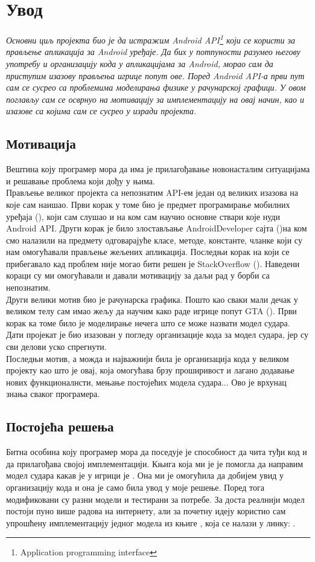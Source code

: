 
\chapter{Увод}
\emph{Основни циљ пројекта био је да истражим Android API\footnote{Application programming interface} који се користи за прављење апликација за Android уређаје. Да бих у потпуности разумео његову употребу и организацију кода у апликацијама за Android, морао сам да приступим изазову прављења игрице попут ове. Поред Android API-а први пут сам се сусрео са проблемима моделирања физике у рачунарској графици. У овом поглављу сам се осврнуо на мотивацију за имплементацију на овај начин, као и изазове са којима сам се сусрео у изради пројекта. }
\section{Мотивација}
Вештина коју програмер мора да има је прилагођавање новонасталим ситуацијама и решавање проблема који дођу у њима. 
\\ \indent Прављење великог пројекта са  непознатим API-ем један од великих изазова на које сам наишао. Први корак у томе био је предмет програмирање мобилних уређаја (\cite{PMU}), који сам слушао и на ком сам научио основне ствари које нуди Android API. Други корак је било злостављање AndroidDeveloper сајта (\cite{AndroidDeveloper})на ком смо налазили на предмету одговарајуће класе, методе, константе, чланке који су нам омогућавали прављење жељених апликација. Последњи корак на који се прибегавало кад проблем није могао бити решен је StackOverflow (\cite{StackOverflow}). Наведени кораци су ми омогућавали и давали мотивацију за даљи рад у борби са непознатим.
\\ \indent Други велики мотив био је рачунарска графика. Пошто као сваки мали дечак у великом телу сам имао жељу да научим како раде игрице попут GTA (\cite{GTA}). Први корак ка томе било је моделирање нечега што се може назвати модел судара. Дати пројекат је био изазован у погледу организације кода за модел судара, јер су сви делови уско спрегнути.
\\ \indent Последњи мотив, а можда и најважнији била је организација кода у великом пројекту као што је овај, која омогућава брзу проширивост и лагано додавање нових функционалнсти, мењање постојећих модела судара... Ово је врхунац знања сваког програмера.

\section{Постојећа решења}
Битна особина коју програмер мора да поседује је способност да чита туђи код и да прилагођава својој имплементацији. Књига која ми је је помогла да направим модел судара какав је у игрици је \cite{EngBook}. Она ми је омогућила да добијем увид у организацију кода и она је само била увод у моје решење. Поред тога модификовани су разни модели и тестирани за потребе. За доста реалнији модел постоји пуно више радова на интернету, али за почетну идеју користио сам упрошћену имплементацију једног модела из књиге \cite{EngBook}, која се налази у линку: 		\cite{ModCol}.

